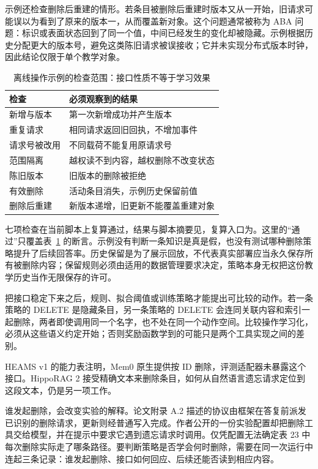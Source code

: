示例还检查删除后重建的情形。若条目被删除后重建时版本又从一开始，旧请求可能误以为看到了原来的版本一，从而覆盖新对象。这个问题通常被称为 ABA 问题：标识或表面状态回到了同一个值，中间已经发生的变化却被隐藏。示例根据历史分配更大的版本号，避免这类陈旧请求被误接收；它并未实现分布式版本时钟，因此结论仅限于单个教学对象。

\begin{table}[htbp]
\centering
\caption{离线操作示例的检查范围：接口性质不等于学习效果}
\label{tab:ch06-contract}
\begin{tabular}{>{\raggedright\arraybackslash}p{4.0cm}>{\raggedright\arraybackslash}p{9.0cm}}
\toprule
检查 & 必须观察到的结果 \\
\midrule
新增与版本 & 第一次新增成功并产生版本 \\
重复请求 & 相同请求返回旧回执，不增加事件 \\
请求号被改用 & 不同载荷不能复用原请求号 \\
范围隔离 & 越权读不到内容，越权删除不改变状态 \\
陈旧版本 & 旧版本的删除被拒绝 \\
有效删除 & 活动条目消失，示例历史保留前值 \\
删除后重建 & 新版本递增，旧更新不能覆盖重建对象 \\
\bottomrule
\end{tabular}
\end{table}

七项检查在当前脚本上复算通过，结果与脚本摘要见，复算入口为。这里的“通过”只覆盖表~\ref{tab:ch06-contract} 的断言。示例没有判断一条知识是真是假，也没有测试哪种删除策略提升了后续回答率。历史保留是为了展示回放，不代表真实部署应当永久保存所有被删除内容；保留规则必须由适用的数据管理要求决定，策略本身无权把这份教学历史当作无限保存的许可。

把接口稳定下来之后，规则、拟合阈值或训练策略才能提出可比较的动作。若一条策略的 DELETE 是隐藏条目，另一条策略的 DELETE 会连同关联内容和索引一起删除，两者即使调用同一个名字，也不处在同一个动作空间。比较操作学习化，必须从这些语义约定开始；否则奖励函数学到的可能只是两个工具实现之间的差别。

HEAMS v1 的能力表注明，Mem0 原生提供按 ID 删除，评测适配器未暴露这个接口。HippoRAG 2 接受精确文本来删除条目，如何从自然语言遗忘请求定位到这段文本，仍是另一项工作\cite{heams-2611}。

谁发起删除，会改变实验的解释。论文附录 A.2 描述的协议由框架在答复前派发已识别的删除请求，更新则经普通写入完成\cite{heams-2611}。作者公开的一份实验配置却把删除工具交给模型，并在提示中要求它遇到遗忘请求时调用\cite{heams-campaign-2026}。仅凭配置无法确定表 23 中每次删除实际走了哪条路径。要判断策略是否学会何时删除，需要在同一次运行中连起三条记录：谁发起删除、接口如何回应、后续还能否读到相应内容。



